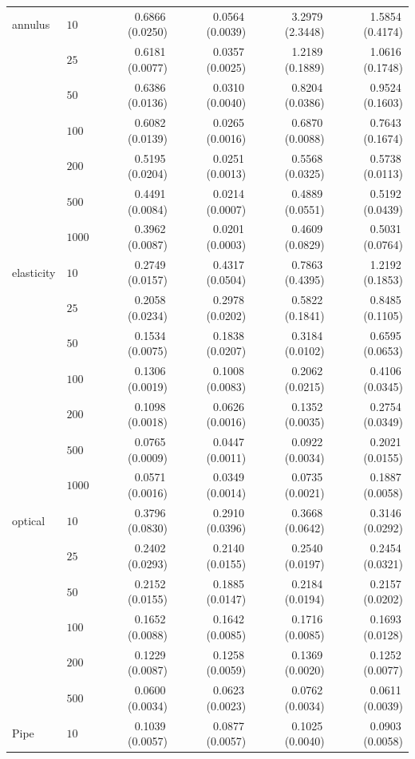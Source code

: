 \documentclass{article}
\begin{document}
\begin{table}[t]
\begin{tabular}{llrrrr}
annulus & $10$ & 0.6866\,(0.0250) & 0.0564\,(0.0039) & 3.2979\,(2.3448) & 1.5854\,(0.4174)\\
 & $25$ & 0.6181\,(0.0077) & 0.0357\,(0.0025) & 1.2189\,(0.1889) & 1.0616\,(0.1748)\\
 & $50$ & 0.6386\,(0.0136) & 0.0310\,(0.0040) & 0.8204\,(0.0386) & 0.9524\,(0.1603)\\
 & $100$ & 0.6082\,(0.0139) & 0.0265\,(0.0016) & 0.6870\,(0.0088) & 0.7643\,(0.1674)\\
 & $200$ & 0.5195\,(0.0204) & 0.0251\,(0.0013) & 0.5568\,(0.0325) & 0.5738\,(0.0113)\\
 & $500$ & 0.4491\,(0.0084) & 0.0214\,(0.0007) & 0.4889\,(0.0551) & 0.5192\,(0.0439)\\
 & $1000$ & 0.3962\,(0.0087) & 0.0201\,(0.0003) & 0.4609\,(0.0829) & 0.5031\,(0.0764)\\
elasticity & $10$ & 0.2749\,(0.0157) & 0.4317\,(0.0504) & 0.7863\,(0.4395) & 1.2192\,(0.1853)\\
 & $25$ & 0.2058\,(0.0234) & 0.2978\,(0.0202) & 0.5822\,(0.1841) & 0.8485\,(0.1105)\\
 & $50$ & 0.1534\,(0.0075) & 0.1838\,(0.0207) & 0.3184\,(0.0102) & 0.6595\,(0.0653)\\
 & $100$ & 0.1306\,(0.0019) & 0.1008\,(0.0083) & 0.2062\,(0.0215) & 0.4106\,(0.0345)\\
 & $200$ & 0.1098\,(0.0018) & 0.0626\,(0.0016) & 0.1352\,(0.0035) & 0.2754\,(0.0349)\\
 & $500$ & 0.0765\,(0.0009) & 0.0447\,(0.0011) & 0.0922\,(0.0034) & 0.2021\,(0.0155)\\
 & $1000$ & 0.0571\,(0.0016) & 0.0349\,(0.0014) & 0.0735\,(0.0021) & 0.1887\,(0.0058)\\
optical & $10$ & 0.3796\,(0.0830) & 0.2910\,(0.0396) & 0.3668\,(0.0642) & 0.3146\,(0.0292)\\
 & $25$ & 0.2402\,(0.0293) & 0.2140\,(0.0155) & 0.2540\,(0.0197) & 0.2454\,(0.0321)\\
 & $50$ & 0.2152\,(0.0155) & 0.1885\,(0.0147) & 0.2184\,(0.0194) & 0.2157\,(0.0202)\\
 & $100$ & 0.1652\,(0.0088) & 0.1642\,(0.0085) & 0.1716\,(0.0085) & 0.1693\,(0.0128)\\
 & $200$ & 0.1229\,(0.0087) & 0.1258\,(0.0059) & 0.1369\,(0.0020) & 0.1252\,(0.0077)\\
 & $500$ & 0.0600\,(0.0034) & 0.0623\,(0.0023) & 0.0762\,(0.0034) & 0.0611\,(0.0039)\\
 Pipe & $10$ & 0.1039\,(0.0057) & 0.0877\,(0.0057) & 0.1025\,(0.0040) & 0.0903\,(0.0058)\\

\end{tabular}
\end{table}
\end{document}
